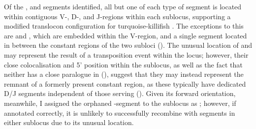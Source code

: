 Of the \vh, \dh and \jh segments identified, all but one of each type of segment is located within contiguous V-, D-, and J-regions within each sublocus, supporting a modified translocon configuration for turquoise-killifish \igh. The exceptions to this are  and , which are embedded within the  V-region, and a single \vh segment located in between the  constant regions of the two subloci (). The unusual location of  and  may represent the result of a transposition event within the \igh{} locus; however, their close colocalisation and 5' position within the  sublocus, as well as the fact that neither has a close paralogue in  (), suggest that they may instead represent the remnant of a formerly present  constant region, as these typically have dedicated D/J segments independent of those serving  (). Given its forward orientation, meanwhile, I assigned the orphaned \vh-segment to the  sublocus as ; however, if annotated correctly, it is unlikely to successfully recombine with segments in either sublocus due to its unusual location.
		
